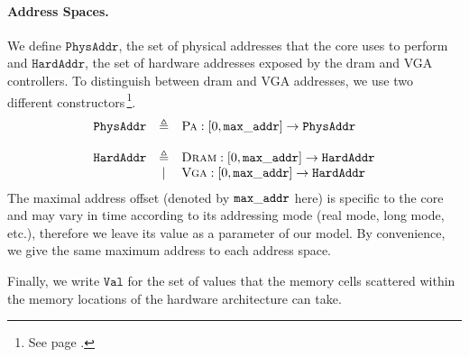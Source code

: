 \paragraph{Address Spaces.}
%
We define $\texttt{PhysAddr}$, the set of physical addresses that the core uses
to perform \IO and $\texttt{HardAddr}$, the set of hardware addresses exposed by
the \ac{dram} and VGA controllers.
%
To distinguish between \ac{dram} and VGA addresses, we use two different
constructors\,\footnote{See page \pageref{frontmatter:notations}.}.
%
\[
  \begin{array}{rcl}
    \texttt{PhysAddr}
    & \triangleq
    & \textsc{Pa} : [0, \val{max\_addr}] \rightarrow
      \texttt{PhysAddr} \\
    & %
    & \\ %
    \texttt{HardAddr}
    & \triangleq
    & \textsc{Dram} : [0, \val{max\_addr}] \rightarrow
      \texttt{HardAddr} \\
    & |
    & \textsc{Vga} : [0, \val{max\_addr}] \rightarrow
      \texttt{HardAddr}
  \end{array}
\]
%
The maximal address offset (denoted by $\mathtt{max\_addr}$ here) is specific to
the core and may vary in time according to its addressing mode (real mode, long
mode, etc.), therefore we leave its value as a parameter of our model.
%
By convenience, we give the same maximum address to each address space.

Finally, we write $\texttt{Val}$ for the set of values that the memory cells
scattered within the memory locations of the hardware architecture can take.

